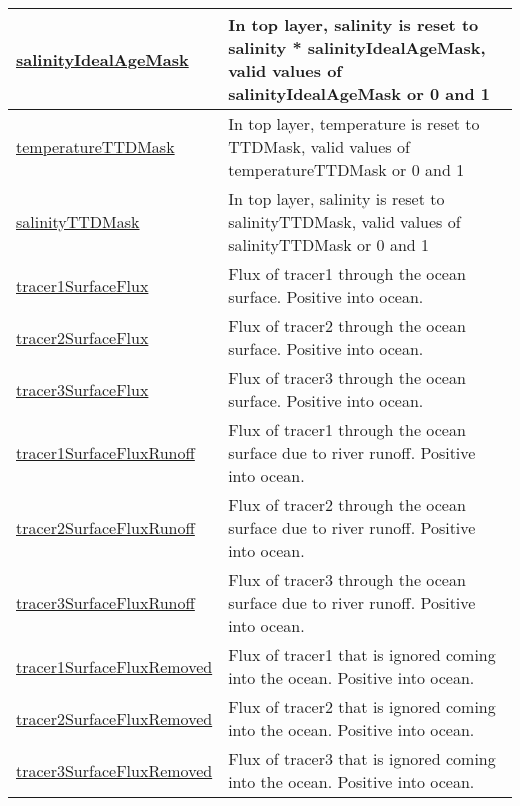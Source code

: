 {\begin{center}
\begin{longtable}{| p{2.0in} | p{4.0in} |}
    \hline
    \hyperref[subsec:var_sec_forcing_salinityIdealAgeMask]{salinityIdealAgeMask} & In top layer, salinity is reset to salinity * salinityIdealAgeMask, valid values of salinityIdealAgeMask or 0 and 1 \\
    \hline
    \hyperref[subsec:var_sec_forcing_temperatureTTDMask]{temperatureTTDMask} & In top layer, temperature is reset to TTDMask, valid values of temperatureTTDMask or 0 and 1 \\
    \hline
    \hyperref[subsec:var_sec_forcing_salinityTTDMask]{salinityTTDMask} & In top layer, salinity is reset to salinityTTDMask, valid values of salinityTTDMask or 0 and 1 \\
    \hline
    \hyperref[subsec:var_sec_forcing_tracer1SurfaceFlux]{tracer1SurfaceFlux} & Flux of tracer1 through the ocean surface. Positive into ocean. \\
    \hline
    \hyperref[subsec:var_sec_forcing_tracer2SurfaceFlux]{tracer2SurfaceFlux} & Flux of tracer2 through the ocean surface. Positive into ocean. \\
    \hline
    \hyperref[subsec:var_sec_forcing_tracer3SurfaceFlux]{tracer3SurfaceFlux} & Flux of tracer3 through the ocean surface. Positive into ocean. \\
    \hline
    \hyperref[subsec:var_sec_forcing_tracer1SurfaceFluxRunoff]{tracer1SurfaceFluxRunoff} & Flux of tracer1 through the ocean surface due to river runoff. Positive into ocean. \\
    \hline
    \hyperref[subsec:var_sec_forcing_tracer2SurfaceFluxRunoff]{tracer2SurfaceFluxRunoff} & Flux of tracer2 through the ocean surface due to river runoff. Positive into ocean. \\
    \hline
    \hyperref[subsec:var_sec_forcing_tracer3SurfaceFluxRunoff]{tracer3SurfaceFluxRunoff} & Flux of tracer3 through the ocean surface due to river runoff. Positive into ocean. \\
    \hline
    \hyperref[subsec:var_sec_forcing_tracer1SurfaceFluxRemoved]{tracer1SurfaceFluxRemoved} & Flux of tracer1 that is ignored coming into the ocean. Positive into ocean. \\
    \hline
    \hyperref[subsec:var_sec_forcing_tracer2SurfaceFluxRemoved]{tracer2SurfaceFluxRemoved} & Flux of tracer2 that is ignored coming into the ocean. Positive into ocean. \\
    \hline
    \hyperref[subsec:var_sec_forcing_tracer3SurfaceFluxRemoved]{tracer3SurfaceFluxRemoved} & Flux of tracer3 that is ignored coming into the ocean. Positive into ocean. \\

\end{longtable}
\end{center}}
